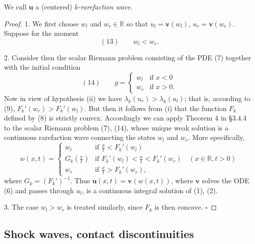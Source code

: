 \begin{remark}
\label{rem:k-rarefaction-wave-terminology}
We call $\mathbf{u}$ a (centered) $k$-\textit{rarefaction wave}.
\end{remark}

\begin{figure}[h]\centering
\end{figure}

\begin{proof}
1. We first choose $w_l$ and $w_r \in \mathbb{R}$ so that $u_l = \mathbf{v}(w_l)$, $u_r = \mathbf{v}(w_r)$. Suppose for the moment
$$(13) \qquad w_l < w_r.$$

2. Consider then the scalar Riemann problem consisting of the PDE (7) together with the initial condition
$$(14) \qquad g = \begin{cases} w_l & \text{if } x<0 \\ w_r & \text{if } x>0. \end{cases}$$
Now in view of hypothesis (ii) we have $\lambda_k(u_r) > \lambda_k(u_l)$; that is, according to (9), $F_k'(w_r) > F_k'(w_l)$. But then it follows from (i) that the function $F_k$ defined by (8) is strictly convex. Accordingly we can apply Theorem 4 in \S3.4.4 to the scalar Riemann problem (7), (14), whose unique weak solution is a continuous rarefaction wave connecting the states $w_l$ and $w_r$. More specifically,
$$w(x,t) = \begin{cases} w_l & \text{if } \frac{x}{t} < F_k'(w_l) \\ G_k\left(\frac{x}{t}\right) & \text{if } F_k'(w_l) < \frac{x}{t} < F_k'(w_r) \quad (x\in\mathbb{R}, t>0) \\ w_r & \text{if } \frac{x}{t} > F_k'(w_r), \end{cases}$$
where $G_k = (F_k')^{-1}$. Thus $\mathbf{u}(x,t) = \mathbf{v}(w(x,t))$, where $\mathbf{v}$ solves the ODE (6) and passes through $u_l$, is a continuous integral solution of (1), (2).

3. The case $w_l > w_r$ is treated similarly, since $F_k$ is then concave. $\square$
\end{proof}

\subsection{Shock waves, contact discontinuities}\label{sec:shock-waves-contact-discontinuities}

